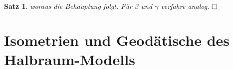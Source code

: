 \documentclass[11pt]{book}
\numberwithin{dummy}{section}
\newtheorem{theorem}{Satz}[section]
\theoremstyle{nonumberbreak}
\newenvironment{pr}[1][]{\ifthenelse{\equal{#1}{}}{\proof}{\proof[#1]}\rm}{\endproof}
\begin{document}
\begin{spacing}{1.4}
\begin{theorem}
\begin{pr}
woraus die Behauptung folgt. Für $\beta$ und $\gamma$ verfahre analog. $\hfill \Box$



\end{pr}



\end{theorem}











\section{Isometrien und Geodätische des Halbraum-Modells} %



\end{spacing}
\end{document}
